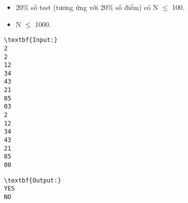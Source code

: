 \begin{itemize}
	\item 20\% số test (tương ứng với 20\% số điểm) có N  $\le$  100.
	\item N  $\le$  1000.
\end{itemize}
\begin{verbatim}
\textbf{Input:}
2
2
12
34
43
21
85
03
2
12
34
43
21
85
00\end{verbatim}
\begin{verbatim}
\textbf{Output:}
YES
NO\end{verbatim}